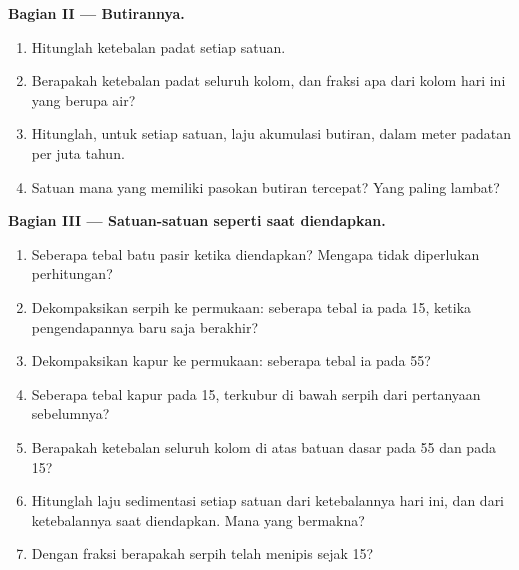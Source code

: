 \begin{problem}
\noindent\textbf{Bagian II --- Butirannya.}
\begin{enumerate}[resume]
  \item Hitunglah ketebalan padat setiap satuan.
  \item Berapakah ketebalan padat seluruh kolom, dan fraksi apa dari kolom hari ini yang berupa air?
  \item Hitunglah, untuk setiap satuan, laju akumulasi butiran, dalam meter padatan per juta tahun.
  \item Satuan mana yang memiliki pasokan butiran tercepat? Yang paling lambat?
\end{enumerate}

\noindent\textbf{Bagian III --- Satuan-satuan seperti saat diendapkan.}
\begin{enumerate}[resume]
  \item Seberapa tebal batu pasir ketika diendapkan? Mengapa tidak diperlukan perhitungan?
  \item Dekompaksikan serpih ke permukaan: seberapa tebal ia pada \qty{15}{\Ma}, ketika pengendapannya baru saja berakhir?
  \item Dekompaksikan kapur ke permukaan: seberapa tebal ia pada \qty{55}{\Ma}?
  \item Seberapa tebal kapur pada \qty{15}{\Ma}, terkubur di bawah serpih dari pertanyaan sebelumnya?
  \item Berapakah ketebalan seluruh kolom di atas batuan dasar pada \qty{55}{\Ma} dan pada \qty{15}{\Ma}?
  \item Hitunglah laju sedimentasi setiap satuan dari ketebalannya hari ini, dan dari ketebalannya saat diendapkan. Mana yang bermakna?
  \item Dengan fraksi berapakah serpih telah menipis sejak \qty{15}{\Ma}?
\end{enumerate}


\end{problem}
